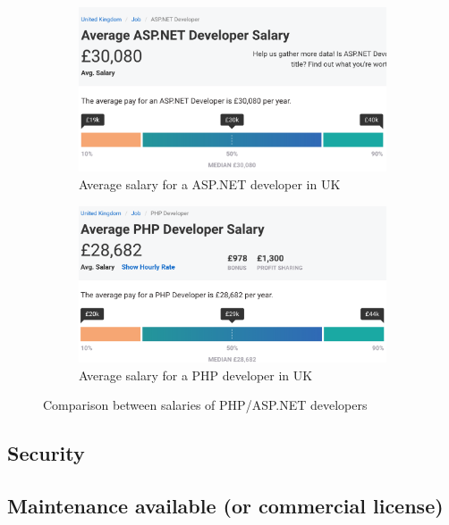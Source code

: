 \documentclass[11]{article}
\begin{document}
		\begin{figure}
				\centering
						\begin{subfigure}{.5\textwidth}
						  \centering
						  \includegraphics[scale=0.45]{aspSalary}
						  \caption{Average salary for a ASP.NET developer in UK}
						  \label{fig:sub1}
						\end{subfigure}%

						\begin{subfigure}{.5\textwidth}
						  \centering
						  \includegraphics[scale=0.45]{phpSalary}
						  \caption{Average salary for a PHP developer in UK}
						  \label{fig:sub2}
						\end{subfigure}

				\caption{Comparison between salaries of PHP/ASP.NET developers}
				\label{salaryComp}
		\end{figure}
	
	\subsection{Security}

	\subsection{Maintenance available (or commercial license)}
\end{document}
